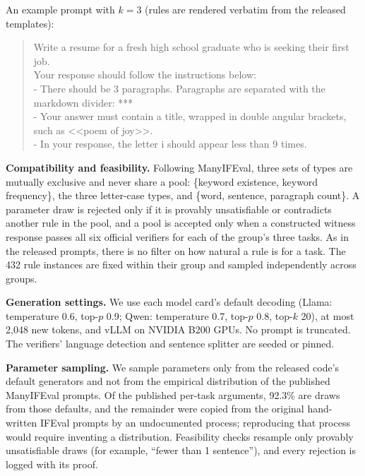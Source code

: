 \documentclass{article}
\begin{document}
\begin{table}[h]
\centering\footnotesize
\caption{The 15 rule types, the parameters drawn by the released code's default generators (``rel.'' is ``less than''
or ``at least'', each with probability one half), and the number of training and test groups whose six-rule pool
contains the type under the adopted split.}
\label{tab:types}
\setlength{\tabcolsep}{3pt}\scriptsize

\end{table}

An example prompt with $k=3$ (rules are rendered verbatim from the released templates):
\begin{quote}\footnotesize\ttfamily
Write a resume for a fresh high school graduate who is seeking their first job.\\[3pt]
Your response should follow the instructions below:\\
- There should be 3 paragraphs. Paragraphs are separated with the markdown divider: ***\\
- Your answer must contain a title, wrapped in double angular brackets, such as <<poem of joy>>.\\
- In your response, the letter i should appear less than 9 times.
\end{quote}

\textbf{Compatibility and feasibility.} Following ManyIFEval, three sets of types are mutually exclusive and never
share a pool: \{keyword existence, keyword frequency\}, the three letter-case types, and \{word, sentence, paragraph
count\}. A parameter draw is rejected only if it is provably unsatisfiable or contradicts another rule in the pool, and
a pool is accepted only when a constructed witness response passes all six official verifiers for each of the group's
three tasks. As in the released prompts, there is no filter on how natural a rule is for a task. The 432 rule instances
are fixed within their group and sampled independently across groups.

\textbf{Generation settings.} We use each model card's default decoding (Llama: temperature 0.6, top-$p$ 0.9; Qwen:
temperature 0.7, top-$p$ 0.8, top-$k$ 20), at most 2,048 new tokens, and vLLM on NVIDIA B200 GPUs. No prompt is
truncated. The verifiers' language detection and sentence splitter are seeded or pinned.

\textbf{Parameter sampling.} We sample parameters only from the released code's default generators and not from the
empirical distribution of the published ManyIFEval prompts. Of the published per-task arguments, 92.3\% are draws from
those defaults, and the remainder were copied from the original hand-written IFEval prompts by an undocumented process;
reproducing that process would require inventing a distribution. Feasibility checks resample only provably
unsatisfiable draws (for example, ``fewer than 1 sentence''), and every rejection is logged with its proof.
\end{document}
